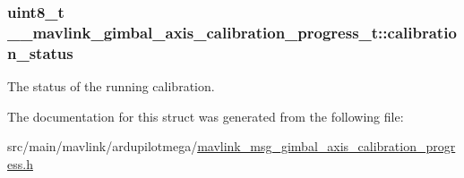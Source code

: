 \hypertarget{struct____mavlink__gimbal__axis__calibration__progress__t_a2531a638bfb57951f9e97e0e0f7f4ae0}{
\subsubsection[{calibration\+\_\+status}]{\setlength{\rightskip}{0pt plus 5cm}uint8\+\_\+t \+\_\+\+\_\+mavlink\+\_\+gimbal\+\_\+axis\+\_\+calibration\+\_\+progress\+\_\+t\+::calibration\+\_\+status}}\label{struct____mavlink__gimbal__axis__calibration__progress__t_a2531a638bfb57951f9e97e0e0f7f4ae0}


The status of the running calibration. 



The documentation for this struct was generated from the following file\+:\begin{DoxyCompactItemize}
\item 
src/main/mavlink/ardupilotmega/\hyperlink{mavlink__msg__gimbal__axis__calibration__progress_8h}{mavlink\+\_\+msg\+\_\+gimbal\+\_\+axis\+\_\+calibration\+\_\+progress.\+h}\end{DoxyCompactItemize}
